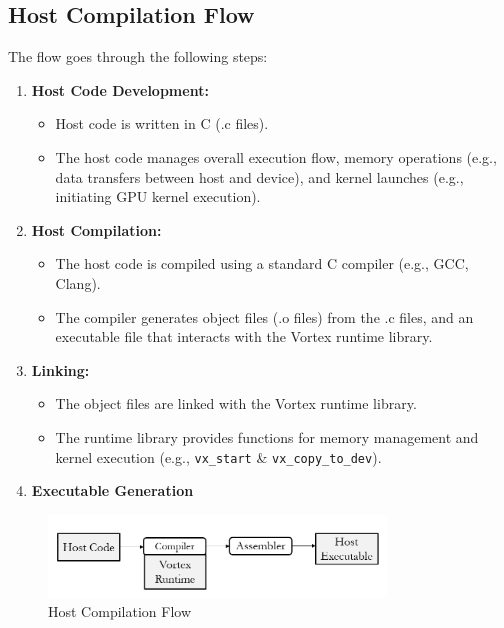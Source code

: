 \documentclass[12pt]{report}
\begin{document}
\subsection{Host Compilation Flow}
The flow goes through the following steps:
\begin{enumerate}
    \item \textbf{Host Code Development:}
        \begin{itemize}
            \item Host code is written in C (.c files).
            \item The host code manages overall execution flow, memory operations (e.g., data transfers between host and device), and kernel launches (e.g., initiating GPU kernel execution).
        \end{itemize}
    \item \textbf{Host Compilation:}
        \begin{itemize}
            \item The host code is compiled using a standard C compiler (e.g., GCC, Clang).
            \item The compiler generates object files (.o files) from the .c files, and an executable file that interacts with the Vortex runtime library.
        \end{itemize}
    \item \textbf{Linking:}
        \begin{itemize}
            \item The object files are linked with the Vortex runtime library.
            \item The runtime library provides functions for memory management and kernel execution (e.g., \texttt{vx\_start} \& \texttt{vx\_copy\_to\_dev}).
        \end{itemize}
    \item \textbf{Executable Generation} 
\end{enumerate}
\begin{figure}[H]
    \centering
    \includegraphics[width=0.8\textwidth]{./figures/host_comp.png}
    \caption{Host Compilation Flow}
\end{figure}
\end{document}

